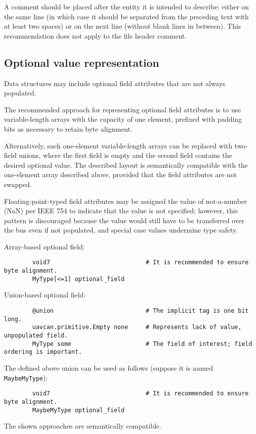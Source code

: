 A comment should be placed after the entity it is intended to describe;
either on the same line (in which case it should be separated from the preceding text with at least two spaces)
or on the next line (without blank lines in between).
This recommendation does not apply to the file header comment.


\subsection{Optional value representation}

Data structures may include optional field attributes that are not always populated.

The recommended approach for representing optional field attributes
is to use variable-length arrays with the capacity of one element,
prefixed with padding bits as necessary to retain byte alignment.

Alternatively, such one-element variable-length arrays can be replaced with two-field unions,
where the first field is empty and the second field contains the desired optional value.
The described layout is semantically compatible with the one-element array described above,
provided that the field attributes are not swapped.

Floating-point-typed field attributes may be assigned the value of not-a-number (NaN) per IEEE 754
to indicate that the value is not specified;
however, this pattern is discouraged because the value would still have to be transferred over the bus
even if not populated, and special case values undermine type safety.

\begin{remark}[breakable]
    Array-based optional field:

    \begin{verbatim}
        void7                           # It is recommended to ensure byte alignment.
        MyType[<=1] optional_field
    \end{verbatim}

    Union-based optional field:

    \begin{verbatim}
        @union                          # The implicit tag is one bit long.
        uavcan.primitive.Empty none     # Represents lack of value, unpopulated field.
        MyType some                     # The field of interest; field ordering is important.
    \end{verbatim}

    The defined above union can be used as follows (suppose it is named \verb|MaybeMyType|):

    \begin{verbatim}
        void7                           # It is recommended to ensure byte alignment.
        MaybeMyType optional_field
    \end{verbatim}

    The shown approaches are semantically compatible.
\end{remark}

